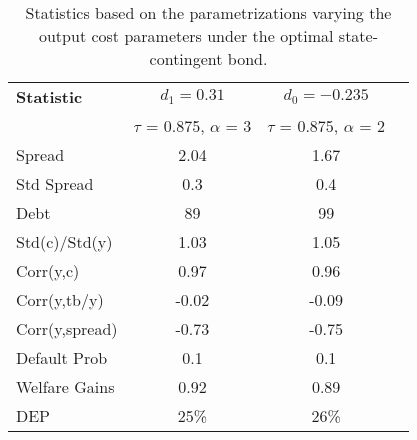 \begin{table}[!hbtp]\centering\small 
\caption{Statistics based on the parametrizations varying the output cost parameters under the optimal state-contingent bond.} \label{table:simulations_sensitivity2}
\begin{tabular}{@{}lccc@{}}\toprule
\textbf{Statistic} & \textbf{$d_1=0.31$} & \textbf{$d_0=-0.235$}\\
& $\tau$ = 0.875, $\alpha$ = 3 & $\tau$ = 0.875, $\alpha$ = 2 &\\\midrule
Spread                   &   2.04          & 1.67                        \\
Std Spread               &   0.3          & 0.4                     \\
Debt                     &    89        & 99                 \\
Std(c)/Std(y)            &     1.03        & 1.05                   \\
Corr(y,c)                &     0.97       & 0.96                  \\
Corr(y,tb/y)             &     -0.02      & -0.09                  \\
Corr(y,spread)           &   -0.73         & -0.75                      \\
Default Prob             &  0.1          & 0.1                      \\
Welfare Gains            & 0.92             & 0.89                    \\
DEP                         & 25\%               &  26\%                      \\
  \bottomrule
\end{tabular}%

\end{table}





